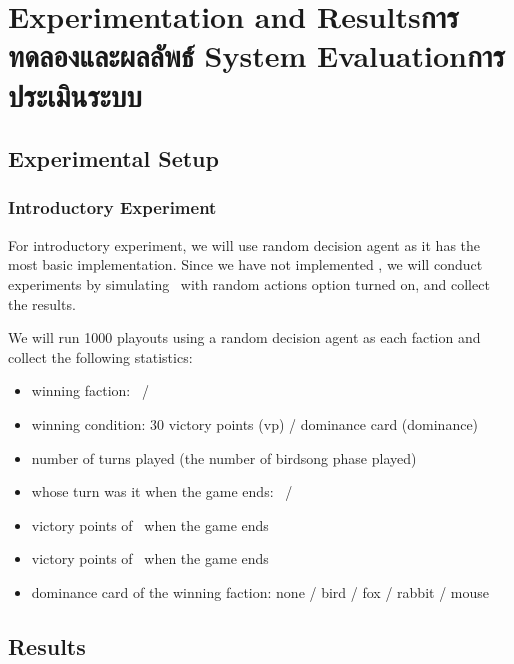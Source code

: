 \chapter{\ifproject%
\ifenglish Experimentation and Results\else การทดลองและผลลัพธ์\fi
\else%
\ifenglish System Evaluation\else การประเมินระบบ\fi
\fi}


\section{Experimental Setup}

\subsection{Introductory Experiment}
For introductory experiment, we will use random decision agent as it has the most basic implementation. Since we have not implemented \RootAI, we will conduct experiments by simulating \RootOurs \ with random actions option turned on, and collect the results. 

We will run 1000 \glspl{playout} using a random decision agent as each faction and collect the following statistics:
\begin{itemize}
    \item winning faction: \Marquise \ / \Eyrie
    \item winning condition: 30 victory points (vp) / dominance card (dominance)
    \item number of turns played (the number of birdsong phase played)
    \item whose turn was it when the game ends: \Marquise \ / \Eyrie
    \item victory points of \Marquise \ when the game ends
    \item victory points of \Eyrie \ when the game ends
    \item dominance card of the winning faction: none / bird / fox / rabbit / mouse
\end{itemize}


\section{Results}

